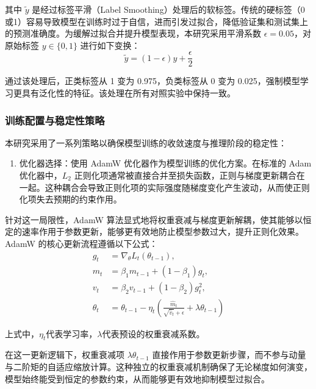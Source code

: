 其中 $ \tilde{y} $ 是经过标签平滑（Label Smoothing）处理后的软标签。传统的硬标签（0或1）容易导致模型在训练时过于自信，进而引发过拟合，降低验证集和测试集上的预测准确度。为缓解过拟合并提升模型表现，本研究采用平滑系数 $ \epsilon=0.05 $，对原始标签 $ y\in\{0,1\} $ 进行如下变换：
\begin{equation}
\tilde{y}=(1-\epsilon)y+\frac{\epsilon}{2}
\end{equation}

通过该处理后，正类标签从 1 变为 0.975，负类标签从 0 变为 0.025，强制模型学习更具有泛化性的特征。该处理在所有对照实验中保持一致。

\subsubsection{训练配置与稳定性策略}

本研究采用了一系列策略以确保模型训练的收敛速度与推理阶段的稳定性：

\begin{enumerate}
\def\labelenumi{(\arabic{enumi})}
\item
  优化器选择：使用 AdamW 优化器作为模型训练的优化方案。在标准的 Adam 优化器中，$ L_2 $ 正则化项通常被直接合并至损失函数，正则与梯度更新耦合在一起。这种耦合会导致正则化项的实际强度随梯度变化产生波动，从而使正则化项失去预期的约束作用。
\end{enumerate}

针对这一局限性，AdamW 算法显式地将权重衰减与梯度更新解耦，使其能够以恒定的速率作用于参数更新，能够更有效地防止模型参数过大，提升正则化效果。AdamW 的核心更新流程遵循以下公式：
\begin{equation}
\begin{aligned}
g_t &= \nabla_{\theta} L_t(\theta_{t-1}), \\
m_t &= \beta_1 m_{t-1} + (1 - \beta_1) g_t, \\
v_t &= \beta_2 v_{t-1} + (1 - \beta_2) g_t^2, \\
\theta_t &= \theta_{t-1} - \eta_t \left( \frac{\hat{m}_t}{\sqrt{\hat{v}_t} + \epsilon} + \lambda \theta_{t-1} \right)
\end{aligned}
\end{equation}

上式中，$ \eta_t $代表学习率，$ \lambda $代表预设的权重衰减系数。

在这一更新逻辑下，权重衰减项 $ \lambda \theta_{t-1} $ 直接作用于参数更新步骤，而不参与动量与二阶矩的自适应缩放计算。这种独立的权重衰减机制确保了无论梯度如何演变，模型始终能受到恒定的参数约束，从而能够更有效地抑制模型过拟合。


